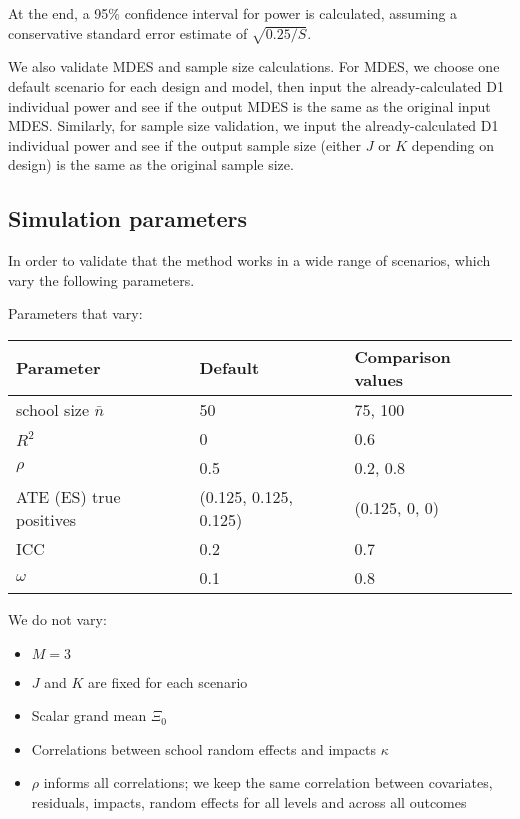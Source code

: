 \documentclass[
]{article}
\providecommand{\tightlist}{%
  \setlength{\itemsep}{0pt}\setlength{\parskip}{0pt}}
\begin{document}
At the end, a 95\% confidence interval for power is calculated, assuming
a conservative standard error estimate of \(\sqrt{0.25/S}\).

We also validate MDES and sample size calculations. For MDES, we choose
one default scenario for each design and model, then input the
already-calculated D1 individual power and see if the output MDES is the
same as the original input MDES. Similarly, for sample size validation,
we input the already-calculated D1 individual power and see if the
output sample size (either \(J\) or \(K\) depending on design) is the
same as the original sample size.

\subsection{Simulation parameters}

In order to validate that the method works in a wide range of scenarios,
which vary the following parameters.

Parameters that vary:

\begin{longtable}[]{@{}lll@{}}
\toprule
Parameter & Default & Comparison values\tabularnewline
\midrule
\endhead
school size \(\bar{n}\) & 50 & 75, 100\tabularnewline
\(R^2\) & 0 & 0.6\tabularnewline
\(\rho\) & 0.5 & 0.2, 0.8\tabularnewline
ATE (ES) true positives & (0.125, 0.125, 0.125) & (0.125, 0,
0)\tabularnewline
ICC & 0.2 & 0.7\tabularnewline
\(\omega\) & 0.1 & 0.8\tabularnewline
\bottomrule
\end{longtable}

We do not vary:

\begin{itemize}
\tightlist
\item
  \(M = 3\)
\item
  \(J\) and \(K\) are fixed for each scenario
\item
  Scalar grand mean \(\Xi_0\)
\item
  Correlations between school random effects and impacts \(\kappa\)
\item
  \(\rho\) informs all correlations; we keep the same correlation
  between covariates, residuals, impacts, random effects for all levels
  and across all outcomes
\end{itemize}
\end{document}
